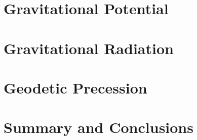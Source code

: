 \documentclass{article}
\begin{document}
\section{Gravitational Potential}


\section{Gravitational Radiation}


\section{Geodetic Precession}


\section{Summary and Conclusions}




\end{document}
